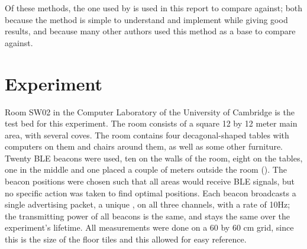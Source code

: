 Of these methods, the one used by \citet{bahl2000radar} is used in this report to compare against; both because the method is simple to understand and implement while giving good results, and because many other authors used this method as a base to compare against.

\section{Experiment}
\label{sec:architecture-experiment}
Room SW02 in the Computer Laboratory of the University of Cambridge is the test bed for this experiment.
The room consists of a square 12 by 12 meter main area, with several coves.
The room contains four decagonal-shaped tables with computers on them and chairs around them, as well as some other furniture.
Twenty BLE beacons were used, ten on the walls of the room, eight on the tables, one in the middle and one placed a couple of meters outside the room ().
The beacon positions were chosen such that all areas would receive BLE signals, but no specific action was taken to find optimal positions.
Each beacon broadcasts a single advertising packet, a unique \bid, on all three channels, with a rate of 10Hz; the transmitting power of all beacons is the same, and stays the same over the experiment's lifetime.
All measurements were done on a 60 by 60 cm grid, since this is the size of the floor tiles and this allowed for easy reference.


